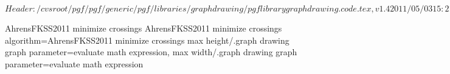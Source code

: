 %
%
%

\ProvidesFileRCS[v\pgfversion] $Header: /cvsroot/pgf/pgf/generic/pgf/libraries/graphdrawing/pgflibrarygraphdrawing.code.tex,v 1.4 2011/05/03 15:21:14 tantau Exp $




%
%
%
%

\pgfgddeclarealgorithmkey
{AhrensFKSS2011 minimize crossings}
{AhrensFKSS2011 minimize crossings}
{%
  algorithm=AhrensFKSS2011 minimize crossings
}
{%
  max height/.graph drawing graph parameter=evaluate math expression,
  max width/.graph drawing graph parameter=evaluate math expression
}



\endinput
